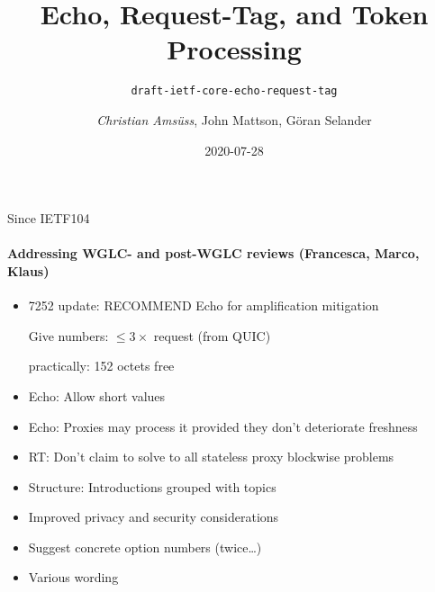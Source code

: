 \documentclass[aspectratio=169]{beamer}
\title{Echo, Request-Tag, and Token Processing}
\subtitle{\texttt{draft-ietf-core-echo-request-tag}}
\author{\textit{Christian Amsüss}, John Mattson, Göran Selander}
\date{2020-07-28}
\begin{document}
\frame{\titlepage}

\begin{frame}{Since IETF104}\begin{center}
	\framesubtitle{Addressing WGLC- and post-WGLC reviews (Francesca, Marco, Klaus)}
	\begin{itemize}
		\item 7252 update: RECOMMEND Echo for amplification mitigation

			Give numbers: $\le 3\times$ request (from QUIC)

			practically: 152 octets free
		\item Echo: Allow short values
		\item Echo: Proxies may process it provided they don't deteriorate freshness
		\item RT: Don't claim to solve to all stateless proxy blockwise problems
		\item Structure: Introductions grouped with topics
		\item Improved privacy and security considerations
		\item Suggest concrete option numbers (twice\ldots)
		\item Various wording
	\end{itemize}
\end{center}\end{frame}
\end{document}
